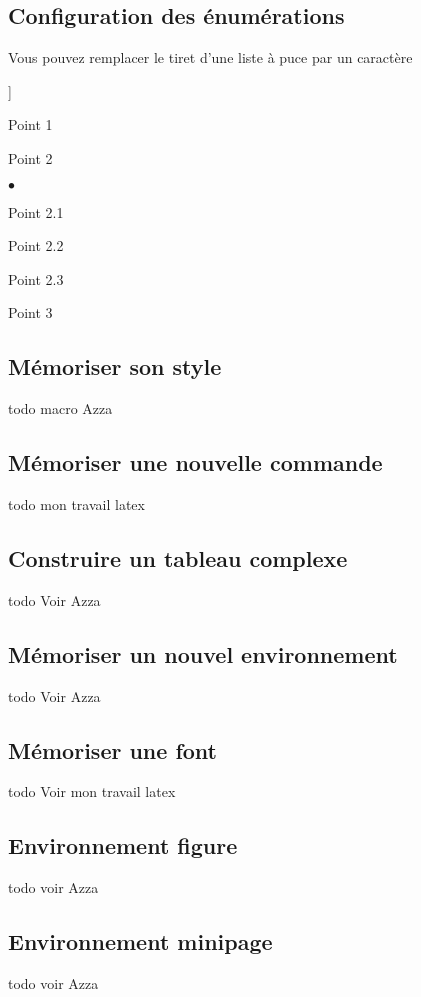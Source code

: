 \subsection{Configuration des énumérations}
Vous pouvez remplacer le tiret d'une liste à puce par un caractère
\begin{list}{]}{}
\item Point 1
\item Point 2
	\begin{list}{$\bullet$}{}
	\item Point 2.1
	\item Point 2.2
	\item Point 2.3
	\end{list}
\item Point 3
\end{list}

\subsection{Mémoriser son style}
todo macro Azza

\subsection{Mémoriser une nouvelle commande}
todo mon travail latex

\subsection{Construire un tableau complexe}
todo  Voir Azza

\subsection{Mémoriser un nouvel environnement}
todo Voir Azza

\subsection{Mémoriser une font}
todo Voir mon travail latex

\subsection{Environnement figure}
todo voir Azza

\subsection{Environnement minipage}
todo voir Azza


